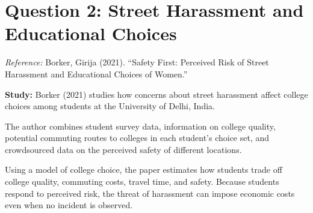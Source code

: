 \documentclass[12pt]{article}
\begin{document}
\begin{enumerate}
\begin{enumerate}
\vspace{4cm}

\end{enumerate}

\end{enumerate}


\clearpage

\section*{Question 2: Street Harassment and Educational Choices}

\noindent\textit{Reference:}
Borker, Girija (2021).
``Safety First: Perceived Risk of Street Harassment
and Educational Choices of Women.''

\medskip

\noindent\textbf{Study:}
Borker (2021) studies how concerns about street harassment
affect college choices among students at the University
of Delhi, India.

The author combines student survey data, information on
college quality, potential commuting routes to colleges
in each student's choice set, and crowdsourced data on
the perceived safety of different locations.

Using a model of college choice, the paper estimates how
students trade off college quality, commuting costs,
travel time, and safety. Because students respond to
perceived risk, the threat of harassment can impose
economic costs even when no incident is observed.
\end{document}
